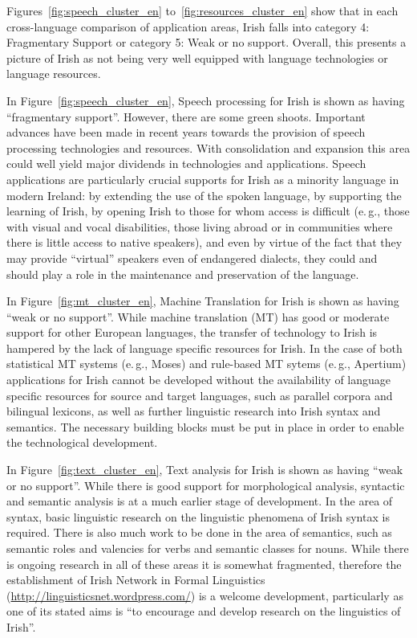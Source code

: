 \begin{multicols}{2}
Figures~\ref{fig:speech_cluster_en} to~\ref{fig:resources_cluster_en} show that in each cross-language comparison of application areas,  Irish falls into category 4: Fragmentary Support or category 5: Weak or no support. Overall, this presents a picture of Irish as not being very well equipped with language technologies or language resources. 

In Figure~\ref{fig:speech_cluster_en}, Speech processing for Irish is shown as having ``fragmentary support''. However, there are some green shoots. Important advances have been made in recent years towards the provision of speech processing technologies and resources. With consolidation and expansion this area could well yield major dividends in technologies and applications. Speech applications are particularly crucial supports for Irish as a minority language in modern Ireland: by extending the use of the spoken language, by supporting the learning of Irish, by opening Irish to those for whom access is difficult (e.\,g., those with visual and vocal disabilities, those living abroad or in communities where there is little access to native speakers), and even by virtue of the fact that they may provide ``virtual'' speakers even of endangered dialects, they could and should play a role in the maintenance and preservation of the language. 

In Figure~\ref{fig:mt_cluster_en}, Machine Translation for Irish is shown as having ``weak or no support''. While machine translation (MT) has good or moderate support for other European languages, the transfer of technology to Irish is hampered by the lack of language specific resources for Irish. In the case of both statistical MT systems (e.\,g., Moses) and rule-based MT sytems (e.\,g., Apertium) applications for Irish cannot be developed  without the availability of language specific resources for source and target languages, such as parallel corpora and bilingual lexicons,  as well as further linguistic research into Irish syntax and semantics. The necessary building blocks must be put in place in order to enable the technological development.

In Figure~\ref{fig:text_cluster_en}, Text analysis for Irish is shown as having ``weak or no support''. While there is good support for morphological analysis, syntactic and semantic analysis is at a much earlier stage of development. In the area of syntax, basic linguistic research on the linguistic phenomena of Irish syntax is required. There is also much work to be done in the area of semantics, such as semantic roles and valencies for verbs and semantic classes for nouns. While there is ongoing research in all of these areas it is somewhat fragmented, therefore the establishment of  Irish Network in Formal Linguistics (\url{http://linguisticsnet.wordpress.com/}) is a welcome development, particularly as one of its stated aims is ``to encourage and develop research on the linguistics of Irish''.


\end{multicols}
